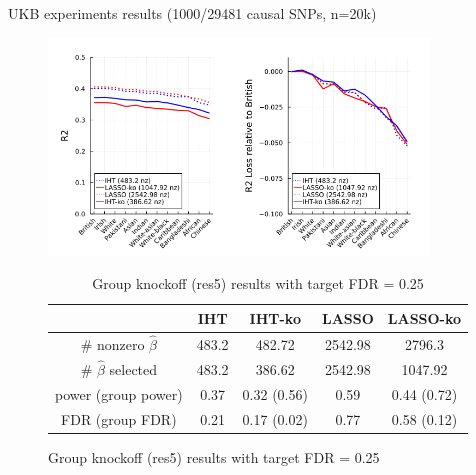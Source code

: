 \documentclass[aspectratio=169, 10pt]{beamer}
\begin{document}
\begin{frame}{UKB experiments results (1000/29481 causal SNPs, n=20k)}
    \begin{minipage}[b]{0.65\linewidth}
        \begin{figure}
            \centering
            \includegraphics[width=0.9\textwidth]{figures/k1000_n20000.png}
            \begin{table}[]
                \centering
                \small
                \begin{tabular}{c|c|c|c|c}
                & IHT & IHT-ko & LASSO & LASSO-ko\\
                \hline
                 \# nonzero $\hat{\beta}$ & 483.2 & 482.72 & 2542.98 & 2796.3\\
                 \# $\hat{\beta}$ selected & 483.2 & 386.62 & 2542.98 & 1047.92\\
                 power (group power) & 0.37 & 0.32 (0.56) & 0.59 & 0.44 (0.72)\\
                 FDR (group FDR) & 0.21 & 0.17 (0.02) & 0.77 & 0.58 (0.12)\\
                 \hline
            \end{tabular}
            \caption{Group knockoff (res5) results with target FDR = 0.25}
    \end{table}
    \end{figure}
    
    \end{minipage}
    \hspace{0.5cm}
    \begin{minipage}[b]{0.25\linewidth}
        \vspace{3cm}
    \end{minipage}
\end{frame}
\end{document}
